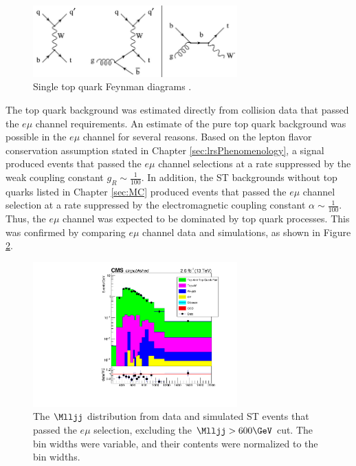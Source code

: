 \begin{figure}[h]
	\centering
	\includegraphics[width=0.7\textwidth]{figures/singleTopQuarkFeynDiagrams.png}
	\caption{Single top quark Feynman diagrams \cite{singleTopQrkDiagrams}.}
	\label{fig:singleTopDiags}
\end{figure}

The top quark background was estimated directly from collision data that passed the $e\mu$ channel requirements.  
An estimate of the pure top quark background was possible in the $e\mu$ channel for several reasons.  Based on 
the lepton flavor conservation assumption stated in Chapter \ref{sec:lrsPhenomenology}, a \WR signal produced 
events that passed the $e\mu$ channel selections at a rate suppressed by the weak coupling constant 
$g_{R} \sim \frac{1}{100}$.  In addition, the ST backgrounds without top quarks listed in Chapter \ref{sec:MC} 
produced events that passed the $e\mu$ channel selection at a rate suppressed by the electromagnetic coupling 
constant $\alpha \sim \frac{1}{100}$.  Thus, the $e\mu$ channel was expected to be dominated by top quark 
processes.  This was confirmed by comparing $e\mu$ channel data and simulations, as shown in Figure \ref{fig:dataAndSimsInEMuChannel}.

\begin{figure}[h]
	\centering
	\includegraphics[width=0.7\textwidth]{figures/Mlljj_eMuChannel_log.pdf}
	\caption{The $\Mlljj$ distribution from data and simulated ST events that passed the $e\mu$ selection, excluding 
	the $\Mlljj > 600 \GeV$ cut.  The bin widths were variable, and their contents were normalized to the bin widths.}
	\label{fig:dataAndSimsInEMuChannel}
\end{figure}

